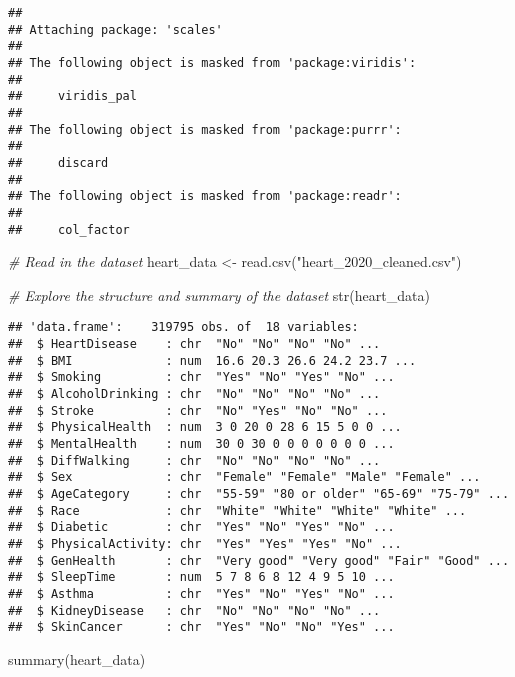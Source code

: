 \documentclass[
]{article}
\newenvironment{Shaded}{\begin{snugshade}}{\end{snugshade}}
\newcommand{\CommentTok}[1]{\textcolor[rgb]{0.56,0.35,0.01}{\textit{#1}}}
\newcommand{\FunctionTok}[1]{\textcolor[rgb]{0.00,0.00,0.00}{#1}}
\newcommand{\NormalTok}[1]{#1}
\newcommand{\OtherTok}[1]{\textcolor[rgb]{0.56,0.35,0.01}{#1}}
\newcommand{\StringTok}[1]{\textcolor[rgb]{0.31,0.60,0.02}{#1}}
\begin{document}
\begin{verbatim}
## 
## Attaching package: 'scales'
## 
## The following object is masked from 'package:viridis':
## 
##     viridis_pal
## 
## The following object is masked from 'package:purrr':
## 
##     discard
## 
## The following object is masked from 'package:readr':
## 
##     col_factor
\end{verbatim}

\begin{Shaded}
\begin{Highlighting}[]
\CommentTok{\# Read in the dataset}
\NormalTok{heart\_data }\OtherTok{\textless{}{-}} \FunctionTok{read.csv}\NormalTok{(}\StringTok{"heart\_2020\_cleaned.csv"}\NormalTok{)}

\CommentTok{\# Explore the structure and summary of the dataset}
\FunctionTok{str}\NormalTok{(heart\_data)}
\end{Highlighting}
\end{Shaded}

\begin{verbatim}
## 'data.frame':    319795 obs. of  18 variables:
##  $ HeartDisease    : chr  "No" "No" "No" "No" ...
##  $ BMI             : num  16.6 20.3 26.6 24.2 23.7 ...
##  $ Smoking         : chr  "Yes" "No" "Yes" "No" ...
##  $ AlcoholDrinking : chr  "No" "No" "No" "No" ...
##  $ Stroke          : chr  "No" "Yes" "No" "No" ...
##  $ PhysicalHealth  : num  3 0 20 0 28 6 15 5 0 0 ...
##  $ MentalHealth    : num  30 0 30 0 0 0 0 0 0 0 ...
##  $ DiffWalking     : chr  "No" "No" "No" "No" ...
##  $ Sex             : chr  "Female" "Female" "Male" "Female" ...
##  $ AgeCategory     : chr  "55-59" "80 or older" "65-69" "75-79" ...
##  $ Race            : chr  "White" "White" "White" "White" ...
##  $ Diabetic        : chr  "Yes" "No" "Yes" "No" ...
##  $ PhysicalActivity: chr  "Yes" "Yes" "Yes" "No" ...
##  $ GenHealth       : chr  "Very good" "Very good" "Fair" "Good" ...
##  $ SleepTime       : num  5 7 8 6 8 12 4 9 5 10 ...
##  $ Asthma          : chr  "Yes" "No" "Yes" "No" ...
##  $ KidneyDisease   : chr  "No" "No" "No" "No" ...
##  $ SkinCancer      : chr  "Yes" "No" "No" "Yes" ...
\end{verbatim}

\begin{Shaded}
\begin{Highlighting}[]
\FunctionTok{summary}\NormalTok{(heart\_data)}
\end{Highlighting}
\end{Shaded}
\end{document}
